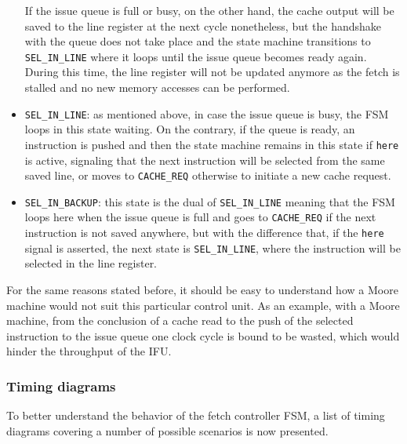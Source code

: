 \begin{itemize}
  If the issue queue is full or busy, on the other hand, the cache output will be saved to the line register at the next cycle nonetheless, but the handshake with the queue does not take place and the state machine transitions to \texttt{SEL\_IN\_LINE} where it loops until the issue queue becomes ready again. During this time, the line register will not be updated anymore as the fetch is stalled and no new memory accesses can be performed. 
  \item \texttt{SEL\_IN\_LINE}: as mentioned above, in case the issue queue is busy, the \acs{FSM} loops in this state waiting. On the contrary, if the queue is ready, an instruction is pushed and then the state machine remains in this state if \texttt{here} is active, signaling that the next instruction will be selected from the same saved line, or moves to \texttt{CACHE\_REQ} otherwise to initiate a new cache request.
  \item \texttt{SEL\_IN\_BACKUP}: this state is the dual of \texttt{SEL\_IN\_LINE} meaning that the \acs{FSM} loops here when the issue queue is full and goes to \texttt{CACHE\_REQ} if the next instruction is not saved anywhere, but with the difference that, if the \texttt{here} signal is asserted, the next state is \texttt{SEL\_IN\_LINE}, where the instruction will be selected in the line register.
\end{itemize}

For the same reasons stated before, it should be easy to understand how a Moore machine would not suit this particular control unit. As an example, with a Moore machine, from the conclusion of a cache read to the push of the selected instruction to the issue queue one clock cycle is bound to be wasted, which would hinder the throughput of the \ac{IFU}.

\subsubsection{Timing diagrams}\label{sec:frontend_timings}
To better understand the behavior of the fetch controller \acs{FSM}, a list of timing diagrams covering a number of possible scenarios is now presented.

